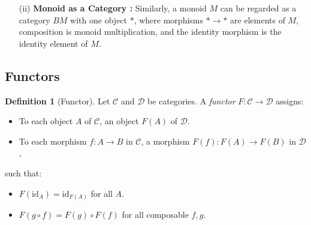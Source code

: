 \documentclass[11pt]{article}
\theoremstyle{definition}
\newtheorem{definition}{Definition}[section]
\theoremstyle{plain}
\begin{document}
\begin{itemize}
\begin{itemize}
\begin{center}
                    \end{center}

              \item[(ii)] \textbf{Monoid as a Category :}
                    Similarly, a monoid $M$ can be regarded as a category $BM$ with one object $\ast$, where morphisms $\ast \to \ast$ are elements of $M$, composition is monoid multiplication, and the identity morphism is the identity element of $M$.

          \end{itemize}


\end{itemize}





\subsection{Functors}

\begin{definition}[Functor]
    Let $\mathcal{C}$ and $\mathcal{D}$ be categories. A \emph{functor} $F : \mathcal{C} \to \mathcal{D}$ assigns:
    \begin{itemize}
        \item To each object $A$ of $\mathcal{C}$, an object $F(A)$ of $\mathcal{D}$.
        \item To each morphism $f : A \to B$ in $\mathcal{C}$, a morphism $F(f) : F(A) \to F(B)$ in $\mathcal{D}$,
    \end{itemize}
    such that:
    \begin{itemize}
        \item $F(\mathrm{id}_A) = \mathrm{id}_{F(A)}$ for all $A$.
        \item $F(g \circ f) = F(g) \circ F(f)$ for all composable $f, g$.
    \end{itemize}
\end{definition}
\end{document}
